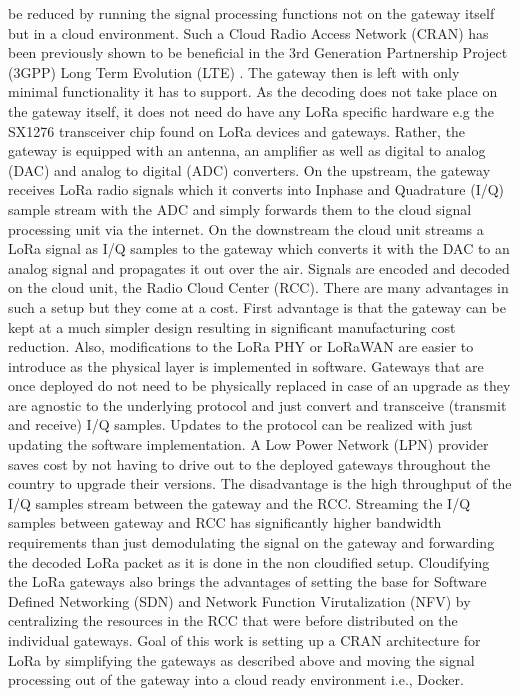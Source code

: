 be reduced by running the signal processing functions not on the gateway itself but in a cloud environment. Such a Cloud Radio
Access Network (CRAN) has been previously shown to be beneficial in the 3rd Generation Partnership
Project (3GPP) Long Term Evolution (LTE) \cite{Sousa2016}. The gateway then is left with only minimal functionality it has to support.
As the decoding does not take place on the gateway itself, it does not need do have any LoRa specific hardware e.g the SX1276 transceiver chip
found on LoRa devices and gateways. Rather, the gateway is equipped with an antenna, an amplifier as well as digital to analog (DAC) and 
analog to digital (ADC) converters. On the upstream, the gateway receives LoRa radio signals which it converts into Inphase and Quadrature 
(I/Q) sample stream with the ADC and simply forwards them to the cloud signal processing unit via the internet. 
On the downstream the cloud unit streams a LoRa signal as I/Q samples to the gateway which converts it with the DAC to an analog signal and 
propagates it out over the air. Signals are encoded and decoded on the cloud unit, the Radio Cloud Center (RCC). There are many advantages in such 
a setup but they come at a cost. First advantage is that the gateway can be kept at a much simpler design resulting in significant manufacturing
cost reduction. Also, modifications to the LoRa PHY or LoRaWAN are easier to introduce as the physical layer is implemented in software. 
Gateways that are once deployed do not need to be physically replaced in case of an upgrade as they are agnostic to the underlying protocol and
just convert and transceive (transmit and receive) I/Q samples. Updates to the protocol can be realized with just updating the software implementation. 
A Low Power Network (LPN) provider saves cost by not having to drive out to the deployed gateways throughout the country to upgrade their versions.
The disadvantage is the high throughput of the I/Q samples stream between the gateway and the RCC. Streaming the I/Q samples between gateway and RCC 
has significantly higher bandwidth requirements than just demodulating the signal on the gateway and forwarding the decoded LoRa packet as it is done 
in the non cloudified setup. Cloudifying the LoRa gateways also brings the advantages of setting the base for Software Defined Networking (SDN) and 
Network Function Virutalization (NFV) by centralizing the resources in the RCC that were before distributed on the individual gateways.
Goal of this work is setting up a CRAN architecture for LoRa by simplifying the gateways as described above and moving the signal processing out of the 
gateway into a cloud ready environment i.e., Docker.






